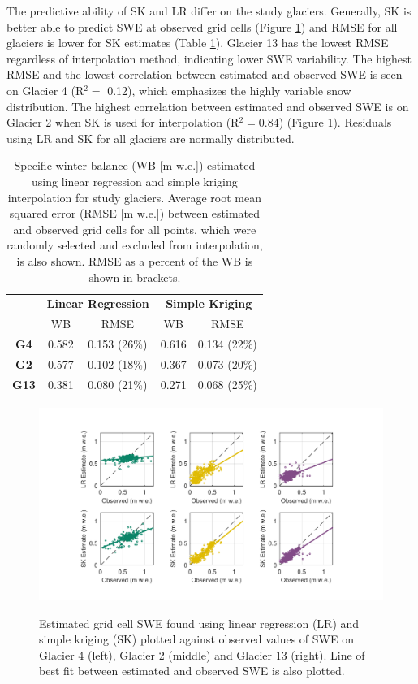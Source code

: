 \documentclass[review,oneside, letterpaper]{igs}
\begin{document}
The predictive ability of SK and LR differ on the study glaciers. Generally, SK is better able to predict SWE at observed grid cells (Figure \ref{fig:observedVSestimated_S2}) and RMSE for all glaciers is lower for SK estimates (Table \ref{tab:WSMB&RMSE}). Glacier 13 has the lowest RMSE regardless of interpolation method, indicating lower SWE variability. The highest RMSE and the lowest correlation between estimated and observed SWE is seen on Glacier 4 (R$^2=$ 0.12), which emphasizes the highly variable snow distribution. The highest correlation between estimated and observed SWE is on Glacier 2 when SK is used for interpolation (R$^2=$0.84) (Figure \ref{fig:observedVSestimated_S2}). Residuals using LR and SK for all glaciers are normally distributed.

\begin{table}[]
\centering
\caption{Specific winter balance (WB [m w.e.]) estimated using linear regression and simple kriging interpolation for study glaciers. Average root mean squared error (RMSE [m w.e.]) between estimated and observed grid cells for all points, which were randomly selected and excluded from interpolation, is also shown. RMSE as a percent of the WB is shown in brackets.}
\label{tab:WSMB&RMSE}
\begin{tabular}{ccccc}
 & \multicolumn{2}{c}{\textbf{Linear Regression}} & \multicolumn{2}{c}{\textbf{Simple Kriging}} \\
 & WB & RMSE & WB & RMSE \\
  \midrule
\textbf{G4} & 0.582 & 0.153 (26\%) & 0.616 & 0.134 (22\%) \\
 \midrule
\textbf{G2} & 0.577 & 0.102 (18\%) & 0.367 & 0.073 (20\%) \\
 \midrule
\textbf{G13} & 0.381 & 0.080 (21\%) & 0.271 & 0.068 (25\%)
\end{tabular}
\end{table}

\begin{figure}
	\centering
	\includegraphics[width =\textwidth]{observedVSestimated_S2.pdf}\\
	\caption{Estimated grid cell SWE found using linear regression (LR) and simple kriging (SK) plotted against observed values of SWE on Glacier 4 (left), Glacier 2 (middle) and Glacier 13 (right). Line of best fit between estimated and observed SWE is also plotted.}
	\label{fig:observedVSestimated_S2}
\end{figure}
\end{document}
